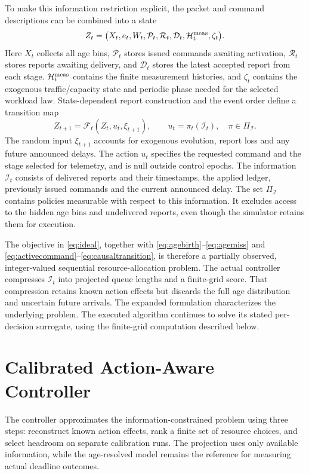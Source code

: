 \documentclass{IEEEoj}
\begin{document}
To make this information restriction explicit, the packet and command
descriptions can be combined into a state
\begin{equation}
 Z_t=\bigl(X_t,e_t,W_t,\mathcal P_t,\mathcal R_t,\mathcal D_t,
           \mathcal H_t^{\rm meas},\zeta_t\bigr).
 \label{eq:augmentedstate}
\end{equation}
Here $X_t$ collects all age bins, $\mathcal P_t$ stores issued commands awaiting
activation, $\mathcal R_t$ stores reports awaiting delivery, and
$\mathcal D_t$ stores the latest accepted report from each stage.
$\mathcal H_t^{\rm meas}$ contains the finite measurement histories, and
$\zeta_t$ contains the exogenous traffic/capacity state and periodic phase
needed for the selected workload law. State-dependent report construction and
the event order define a transition map
\begin{equation}
 Z_{t+1}=\mathcal F_t(Z_t,u_t,\xi_{t+1}),\qquad
 u_t=\pi_t(\mathcal I_t),\quad\pi\in\Pi_{\mathcal I}.
 \label{eq:causaltransition}
\end{equation}
The random input $\xi_{t+1}$ accounts for exogenous evolution, report loss and
any future announced delays. The action $u_t$ specifies the requested command
and the stage selected for telemetry, and is null outside control epochs.
The information $\mathcal I_t$ consists of delivered reports and their
timestamps, the applied ledger, previously issued commands and the current
announced delay. The set $\Pi_{\mathcal I}$ contains policies measurable with
respect to this information. It excludes access to the hidden age bins and
undelivered reports, even though the simulator retains them for execution.

The objective in \eqref{eq:ideal}, together with
\eqref{eq:agebirth}--\eqref{eq:agemiss} and
\eqref{eq:activecommand}--\eqref{eq:causaltransition}, is therefore a
partially observed, integer-valued sequential resource-allocation problem.
The actual controller compresses $\mathcal I_t$ into projected queue lengths
and a finite-grid score. That compression retains known action effects but
discards the full age distribution and uncertain future arrivals. The expanded
formulation characterizes the underlying problem. The executed algorithm
continues to solve its stated per-decision surrogate, using the finite-grid computation described below.

\section{Calibrated Action-Aware Controller}
The controller approximates the information-constrained problem using three
steps: reconstruct known action effects, rank a finite set of resource choices,
and select headroom on separate calibration runs. The projection uses only
available information, while the age-resolved model remains the reference for
measuring actual deadline outcomes.
\end{document}
